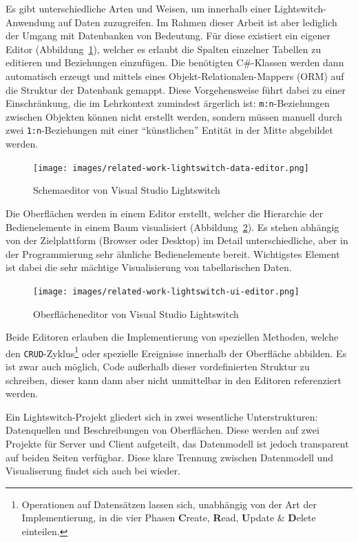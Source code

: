 Es gibt unterschiedliche Arten und Weisen, um innerhalb einer Lightswitch-Anwendung auf Daten zuzugreifen. Im Rahmen dieser Arbeit ist aber lediglich der Umgang mit Datenbanken von Bedeutung. Für diese existiert ein eigener Editor (Abbildung~\ref{fig:lightswitch-data-designer}), welcher es erlaubt die Spalten einzelner Tabellen zu editieren und Beziehungen einzufügen. Die benötigten C\#-Klassen werden dann automatisch erzeugt und mittels eines Objekt-Relationalen-Mappers (ORM) auf die Struktur der Datenbank gemappt. Diese Vorgehensweise führt dabei zu einer Einschränkung, die im Lehrkontext zumindest ärgerlich ist: \lstinline{m:n}-Beziehungen zwischen Objekten können nicht erstellt werden, sondern müssen manuell durch zwei \lstinline{1:n}-Beziehungen mit einer "`künstlichen"' Entität in der Mitte abgebildet werden.

\begin{figure}[h]
  \centering \texttt{[image: images/related-work-lightswitch-data-editor.png]}
  \caption{Schemaeditor von Visual Studio Lightswitch}
  \label{fig:lightswitch-data-designer}
\end{figure}

Die Oberflächen werden in einem Editor erstellt, welcher die Hierarchie der Bedienelemente in einem Baum visualisiert (Abbildung~\ref{fig:lightswitch-ui-designer}). Es stehen abhängig von der Zielplattform (Browser oder Desktop) im Detail unterschiedliche, aber in der Programmierung sehr ähnliche Bedienelemente bereit. Wichtigstes Element ist dabei die sehr mächtige Visualisierung von tabellarischen Daten.

\begin{figure}[h]
  \centering \texttt{[image: images/related-work-lightswitch-ui-editor.png]}
  \caption{Oberflächeneditor von Visual Studio Lightswitch}
  \label{fig:lightswitch-ui-designer}
\end{figure}

Beide Editoren erlauben die Implementierung von speziellen Methoden, welche den \texttt{CRUD}-Zyklus\footnote{Operationen auf Datensätzen lassen sich, unabhängig von der Art der Implementierung, in die vier Phasen \textbf{C}reate, \textbf{R}ead, \textbf{U}pdate \& \textbf{D}elete einteilen.} oder spezielle Ereignisse innerhalb der Oberfläche abbilden. Es ist zwar auch möglich, Code außerhalb dieser vordefinierten Struktur zu schreiben, dieser kann dann aber nicht unmittelbar in den Editoren referenziert werden.

Ein Lightswitch-Projekt gliedert sich in zwei wesentliche Unterstrukturen: Datenquellen und Beschreibungen von Oberflächen. Diese werden auf zwei Projekte für Server und Client aufgeteilt, das Datenmodell ist jedoch transparent auf beiden Seiten verfügbar. Diese klare Trennung zwischen Datenmodell und Visualiserung findet sich auch bei \idename{} wieder.

